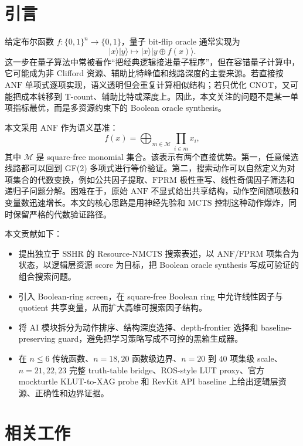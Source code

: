 \documentclass[UTF8,fontset=macnew,11pt]{ctexart}
\newcommand{\method}{Resource-NMCTS}
\newcommand{\screen}{Boolean-ring screen}
\newcommand{\anf}{\ensuremath{\mathrm{ANF}}}
\newcommand{\fprm}{\ensuremath{\mathrm{FPRM}}}
\newcommand{\mcts}{\ensuremath{\mathrm{MCTS}}}
\newcommand{\xor}{\ensuremath{\oplus}}
\newcommand{\ttable}{truth-table}
\begin{document}
\section{引言}

给定布尔函数 $f:\{0,1\}^n\rightarrow\{0,1\}$，量子 bit-flip oracle 通常实现为
\begin{equation}
  |x\rangle |y\rangle \mapsto |x\rangle |y\xor f(x)\rangle .
  \label{eq:oracle-v27}
\end{equation}
这一步在量子算法中常被看作“把经典逻辑接进量子程序”，但在容错量子计算中，它可能成为非 Clifford 资源、辅助比特峰值和线路深度的主要来源。若直接按 \anf{} 单项式逐项实现，语义透明但会重复计算相似结构；若只优化 CNOT，又可能把成本转移到 T-count、辅助比特或深度上。因此，本文关注的问题不是某一单项指标最优，而是多资源约束下的 Boolean oracle synthesis。

本文采用 \anf{} 作为语义基准：
\begin{equation}
  f(x)=\bigoplus_{m\in\mathcal{M}}\prod_{i\in m}x_i ,
  \label{eq:anf-v27}
\end{equation}
其中 $\mathcal{M}$ 是 square-free monomial 集合。该表示有两个直接优势。第一，任意候选线路都可以回到 GF(2) 多项式进行等价验证。第二，搜索动作可以自然定义为对项集合的代数变换，例如公共因子提取、\fprm{} 极性重写、线性奇偶因子筛选和递归子问题分解。困难在于，原始 \anf{} 不显式给出共享结构，动作空间随项数和变量数迅速增长。本文的核心思路是用神经先验和 \mcts{} 控制这种动作爆炸，同时保留严格的代数验证路径。

本文贡献如下：
\begin{itemize}
  \item 提出独立于 SSHR 的 \method{} 搜索表述，以 \anf{}/\fprm{} 项集合为状态，以逻辑层资源 score 为目标，把 Boolean oracle synthesis 写成可验证的组合搜索问题。
  \item 引入 \screen{}，在 square-free Boolean ring 中允许线性因子与 quotient 共享变量，从而扩大高维可搜索因子结构。
  \item 将 AI 模块拆分为动作排序、结构深度选择、depth-frontier 选择和 baseline-preserving guard，避免把学习策略写成不可控的黑箱生成器。
  \item 在 $n\leq6$ 传统函数、$n=18,20$ 函数级边界、$n=20$ 到 $40$ 项集级 scale、$n=21,22,23$ 完整 \ttable{} bridge、ROS-style LUT proxy、官方 mockturtle KLUT-to-XAG probe 和 RevKit API baseline 上给出逻辑层资源、正确性和边界证据。
\end{itemize}

\section{相关工作}
\end{document}
